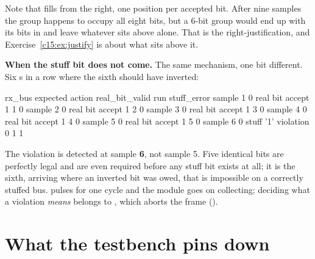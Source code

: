 Note that  fills from the right, one position per accepted bit. After nine samples the
group happens to occupy all eight bits, but a 6-bit group would end up with its bits in
 and leave whatever sits above alone. That is the right-justification, and
Exercise~\ref{c15:ex:justify} is about what sits above it.

\textbf{When the stuff bit does not come.} The same mechanism, one bit different. Six s in a
row where the sixth should have inverted:

\begin{textdrawing}
            rx_bus    expected     action  real_bit_valid    run  stuff_error
sample 1         0    real bit     accept               1     1            0
sample 2         0    real bit     accept               1     2            0
sample 3         0    real bit     accept               1     3            0
sample 4         0    real bit     accept               1     4            0
sample 5         0    real bit     accept               1     5            0
sample 6         0   stuff '1'  violation               0     1            1
\end{textdrawing}

The violation is detected at sample \textbf{6}, not sample 5. Five identical bits are perfectly legal
and are even required before any stuff bit exists at all; it is the sixth, arriving where an inverted
bit was owed, that is impossible on a correctly stuffed bus.  pulses for one cycle
and the module goes on collecting; deciding what a violation \emph{means} belongs to
, which aborts the frame ().

\section{What the testbench pins down}
\label{c15:sec:tb}

